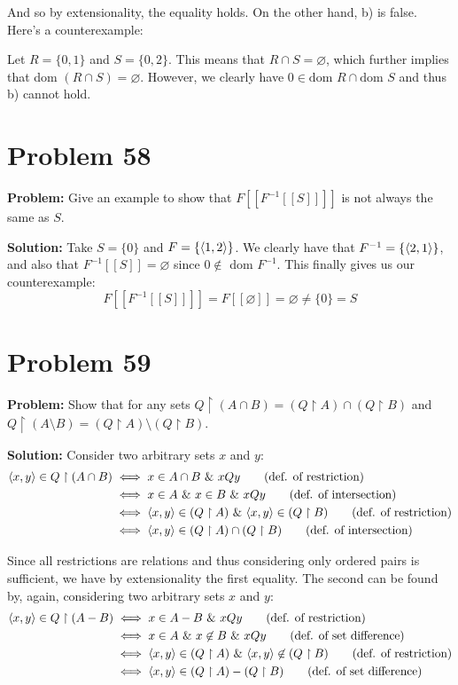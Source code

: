 \documentclass{article}
\begin{document}
And so by extensionality, the equality holds. On the other hand, b) is false. Here's a counterexample:

Let $R=\{0,1\}$ and $S=\{0,2\}$. This means that $R\cap S=\varnothing$, which further implies that dom $(R\cap S)=\varnothing$. However, we clearly have $0\in\text{dom }R\cap\text{dom }S$ and thus b) cannot hold.

\section*{Problem 58}
\noindent\textbf{Problem:} Give an example to show that $F[\![F^{-1}[\![S]\!]]\!]$ is not always the same as $S$.
\bigskip

\noindent\textbf{Solution:} Take $S=\{0\}$ and $F=\{\langle1,2\rangle\}$. We clearly have that $F^{-1}=\{\langle2,1\rangle\}$, and also that $F^{-1}[\![S]\!]=\varnothing$ since $0\not\in$ dom $F^{-1}$. This finally gives us our counterexample:
\begin{equation*}
    F[\![F^{-1}[\![S]\!]]\!]=F[\![\varnothing]\!]=\varnothing\not=\{0\}=S
\end{equation*}

\section*{Problem 59}
\noindent\textbf{Problem:} Show that for any sets $Q\upharpoonright(A\cap B)=(Q\upharpoonright A)\cap(Q\upharpoonright B)$ and $Q\upharpoonright(A\setminus B) = (Q\upharpoonright A)\setminus(Q\upharpoonright B)$.
\bigskip

\noindent\textbf{Solution:} Consider two arbitrary sets $x$ and $y$:
\begin{align*}
    \langle x,y\rangle\in Q\upharpoonright(A\cap B)&\iff x\in A\cap B\,\,\&\,\, xQy\tag{def. of restriction}\\
    &\iff x\in A\,\,\&\,\, x\in B\,\,\&\,\, xQy\tag{def. of intersection}\\
    &\iff \langle x,y\rangle\in(Q\upharpoonright A)\,\,\&\,\, \langle x,y\rangle\in(Q\upharpoonright B)\tag{def. of restriction}\\
    &\iff \langle x,y\rangle\in(Q\upharpoonright A)\cap(Q\upharpoonright B)\tag{def. of intersection}
\end{align*}

Since all restrictions are relations and thus considering only ordered pairs is sufficient, we have by extensionality the first equality. The second can be found by, again, considering two arbitrary sets $x$ and $y$:
\begin{align*}
    \langle x,y\rangle\in Q\upharpoonright(A- B)&\iff x\in A- B\,\,\&\,\, xQy\tag{def. of restriction}\\
    &\iff x\in A\,\,\&\,\, x\not\in B\,\,\&\,\, xQy\tag{def. of set difference}\\
    &\iff \langle x,y\rangle\in(Q\upharpoonright A)\,\,\&\,\, \langle x,y\rangle\not\in(Q\upharpoonright B)\tag{def. of restriction}\\
    &\iff \langle x,y\rangle\in(Q\upharpoonright A)-(Q\upharpoonright B)\tag{def. of set difference}
\end{align*}
\medskip
\end{document}
